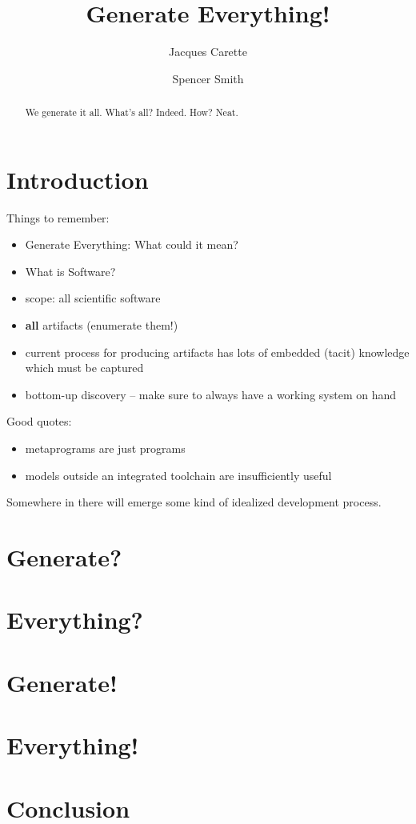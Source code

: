 \documentclass[sigplan,10pt,review]{acmart}
\begin{document}
\title[Generate Everything]{Generate Everything!}
\author{Jacques Carette}
\author{Spencer Smith}

\begin{abstract}
We generate it all. What's all? Indeed. How? Neat.
\end{abstract}


\maketitle

\section{Introduction}

Things to remember:
\begin{itemize}
\item Generate Everything: What could it mean?
\item What is Software?
\item scope: all scientific software
\item \textbf{all} artifacts (enumerate them!)
\item current process for producing artifacts has lots of embedded (tacit)
  knowledge which must be captured
\item bottom-up discovery -- make sure to always have a working system on hand
\end{itemize}

Good quotes:
\begin{itemize}
\item metaprograms are just programs
\item models outside an integrated toolchain are insufficiently useful
\end{itemize}

Somewhere in there will emerge some kind of idealized development process.

\section{Generate?}
\section{Everything?}
\section{Generate!}
\section{Everything!}
\section{Conclusion}
\end{document}

